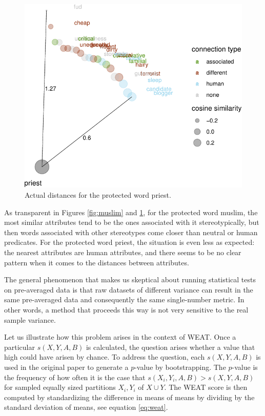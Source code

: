 \documentclass{clv3}
\begin{document}
\begin{figure}

\begin{center}\includegraphics[width=0.9\linewidth]{figures/visPriestd} \end{center}

\caption{Actual distances for the protected word \textsf{priest}.}
\label{fig:priest}
\end{figure}

As transparent in Figures \ref{fig:muslim} and \ref{fig:priest}, for the
protected word \textsf{muslim}, the most similar attributes tend to be
the ones associated with it stereotypically, but then words associated
with other stereotypes come closer than neutral or human predicates. For
the protected word \textsf{priest}, the situation is even less as
expected: the nearest attributes are human attributes, and there
seems to be no clear pattern when it comes to the distances between attributes.

The general phenomenon that makes us skeptical about running statistical
tests on pre-averaged data is that raw datasets of different variance
can result in the same pre-averaged data and consequently the same
single-number metric. In other words, a method that proceeds this way is
not very sensitive to the real sample variance.

Let us illustrate how this problem arises in the context of
\textsf{WEAT}. Once a particular \(s(X,Y,A,B)\) is calculated, the
question arises whether a value that high could have arisen by
chance. To address the question, each \(s(X,Y,A,B)\) is used in the
original paper to generate a \(p\)-value by bootstrapping. The
\(p\)-value is the frequency of how often it is the case that
\(s(X_i,Y_i,A,B)>s(X,Y,A,B)\) for sampled equally sized partitions
\(X_i, Y_i\) of \(X\cup Y\). The WEAT score is then computed by
standardizing the difference in means of means by dividing by the
standard deviation of means, see equation \eqref{eq:weat}.
\end{document}
